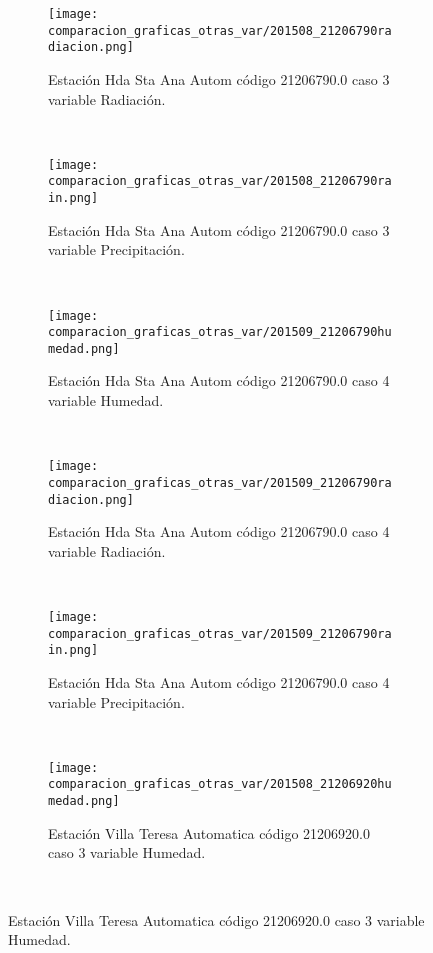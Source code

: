 \begin{figure}[H]
\centering
\begin{subfigure}[normla]{0.4\textwidth}
\caption{Estación Hda Sta Ana Autom código 21206790.0 caso 3 variable Radiación.}
\texttt{[image: comparacion\_graficas\_otras\_var/201508\_21206790radiacion.png]}
\end{subfigure}
~
\begin{subfigure}[normla]{0.4\textwidth}
\caption{Estación Hda Sta Ana Autom código 21206790.0 caso 3 variable Precipitación.}
\texttt{[image: comparacion\_graficas\_otras\_var/201508\_21206790rain.png]}
\end{subfigure}
~
\begin{subfigure}[normla]{0.4\textwidth}
\caption{Estación Hda Sta Ana Autom código 21206790.0 caso 4 variable Humedad.}
\texttt{[image: comparacion\_graficas\_otras\_var/201509\_21206790humedad.png]}
\end{subfigure}
~
\begin{subfigure}[normla]{0.4\textwidth}
\caption{Estación Hda Sta Ana Autom código 21206790.0 caso 4 variable Radiación.}
\texttt{[image: comparacion\_graficas\_otras\_var/201509\_21206790radiacion.png]}
\end{subfigure}
~
\begin{subfigure}[normla]{0.4\textwidth}
\caption{Estación Hda Sta Ana Autom código 21206790.0 caso 4 variable Precipitación.}
\texttt{[image: comparacion\_graficas\_otras\_var/201509\_21206790rain.png]}
\end{subfigure}
~
\begin{subfigure}[normla]{0.4\textwidth}
\caption{Estación Villa Teresa Automatica código 21206920.0 caso 3 variable Humedad.}
\texttt{[image: comparacion\_graficas\_otras\_var/201508\_21206920humedad.png]}
\end{subfigure}
~
\end{figure}
           
